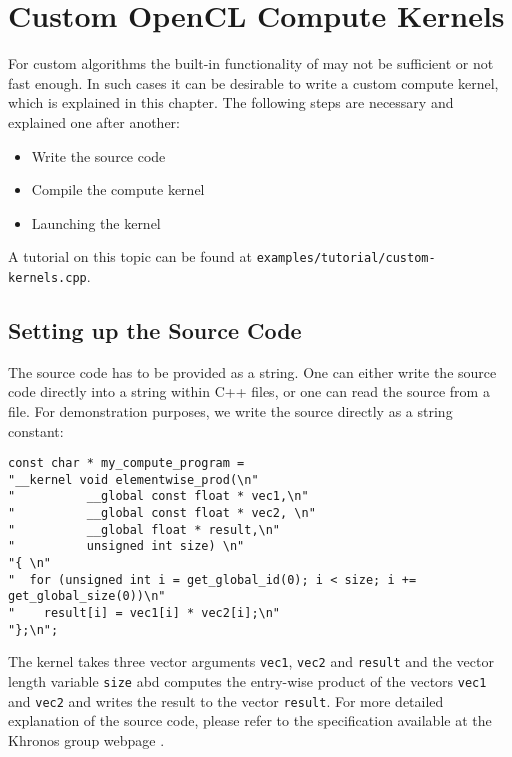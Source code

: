 

\chapter{Custom OpenCL Compute Kernels} \label{chap:custom}

For custom algorithms the built-in functionality of {\ViennaCL} may not be sufficient or not fast enough. In such cases it can be desirable to write a custom {\OpenCL} compute kernel, which is explained in this chapter. The following steps are necessary and explained one after another:
\begin{itemize}
 \item Write the {\OpenCL} source code
 \item Compile the compute kernel
 \item Launching the kernel
\end{itemize}
A tutorial on this topic can be found at \texttt{examples/tutorial/custom-kernels.cpp}.

\section{Setting up the {\OpenCL} Source Code}
The {\OpenCL} source code has to be provided as a string. One can either write the source code directly into a string within C++ files, or one can read the {\OpenCL} source from a file. For demonstration purposes, we write the source directly as a string constant:
\begin{lstlisting}
const char * my_compute_program =
"__kernel void elementwise_prod(\n"
"          __global const float * vec1,\n"
"          __global const float * vec2, \n"
"          __global float * result,\n"
"          unsigned int size) \n"
"{ \n"
"  for (unsigned int i = get_global_id(0); i < size; i += get_global_size(0))\n"
"    result[i] = vec1[i] * vec2[i];\n"
"};\n";
\end{lstlisting}
The kernel takes three vector arguments \lstinline{vec1}, \lstinline{vec2} and \lstinline{result} and the vector length variable \lstinline{size} abd computes the entry-wise product of the vectors \lstinline|vec1| and \lstinline|vec2| and writes the result to the vector \lstinline|result|. For more detailed explanation of the {\OpenCL} source code, please refer to the specification available at the Khronos group webpage \cite{khronoscl}.

